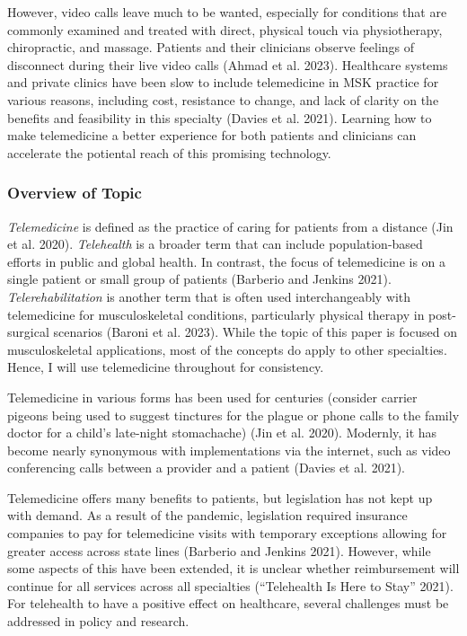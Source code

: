 \documentclass[
  letterpaper,
  DIV=11,
  numbers=noendperiod,
  oneside]{scrartcl}
\begin{document}
However, video calls leave much to be wanted, especially for conditions
that are commonly examined and treated with direct, physical touch via
physiotherapy, chiropractic, and massage. Patients and their clinicians
observe feelings of disconnect during their live video calls (Ahmad et
al. 2023). Healthcare systems and private clinics have been slow to
include telemedicine in MSK practice for various reasons, including
cost, resistance to change, and lack of clarity on the benefits and
feasibility in this specialty (Davies et al. 2021). Learning how to make
telemedicine a better experience for both patients and clinicians can
accelerate the potiental reach of this promising technology.

\begin{figure}

\end{figure}%

\subsubsection{Overview of Topic}\label{overview-of-topic}

\emph{Telemedicine} is defined as the practice of caring for patients
from a distance (Jin et al. 2020). \emph{Telehealth} is a broader term
that can include population-based efforts in public and global health.
In contrast, the focus of telemedicine is on a single patient or small
group of patients (Barberio and Jenkins 2021). \emph{Telerehabilitation}
is another term that is often used interchangeably with telemedicine for
musculoskeletal conditions, particularly physical therapy in
post-surgical scenarios (Baroni et al. 2023). While the topic of this
paper is focused on musculoskeletal applications, most of the concepts
do apply to other specialties. Hence, I will use telemedicine throughout
for consistency.

Telemedicine in various forms has been used for centuries (consider
carrier pigeons being used to suggest tinctures for the plague or phone
calls to the family doctor for a child's late-night stomachache) (Jin et
al. 2020). Modernly, it has become nearly synonymous with
implementations via the internet, such as video conferencing calls
between a provider and a patient (Davies et al. 2021).

Telemedicine offers many benefits to patients, but legislation has not
kept up with demand. As a result of the pandemic, legislation required
insurance companies to pay for telemedicine visits with temporary
exceptions allowing for greater access across state lines (Barberio and
Jenkins 2021). However, while some aspects of this have been extended,
it is unclear whether reimbursement will continue for all services
across all specialties ({``Telehealth Is Here to Stay''} 2021). For
telehealth to have a positive effect on healthcare, several challenges
must be addressed in policy and research.
\end{document}
